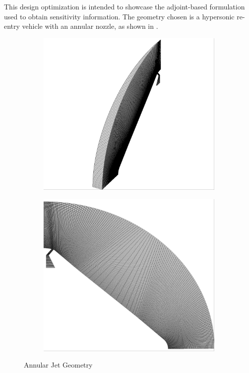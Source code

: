 This design optimization is intended to showcase the adjoint-based formulation
used to obtain sensitivity information.  The geometry chosen is a hypersonic
re-entry vehicle with an annular nozzle, as shown in
.
\begin{figure}[h]
  \centering
	\begin{subfigure}[b]{0.4\textwidth}
    \centering
    \includegraphics[width=\textwidth]{figures/all_iso.png}
  \end{subfigure}
	\begin{subfigure}[b]{0.4\textwidth}
    \centering
    \includegraphics[width=\textwidth]{figures/all_side.png}
  \end{subfigure}
  \caption{Annular Jet Geometry}
  \label{fig:annular-jet-side}
\end{figure}
